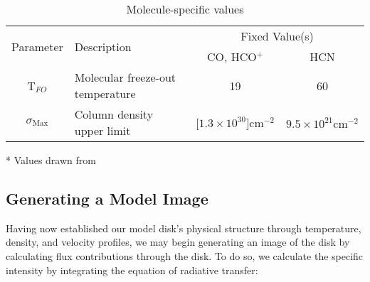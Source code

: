 \begin{table}
  \begin{threeparttable}
    \centering
    \caption{Molecule-specific values}
    \label{tab:mol_specifics}
    \renewcommand{\arraystretch}{1.2}
    \begin{tabular}{c  l  c c }
      \toprule \toprule
      \multirow{2}{*}{Parameter} & \multirow{2}{*}{Description}    & \multicolumn{2}{c}{Fixed Value(s)} \\
                                 &                                 & CO, HCO$^+$ & HCN \\
      \midrule %
      T$_{FO}$            &  Molecular freeze-out temperature      &  19 & 60    \\
      $\sigma_\text{Max}$ & Column density upper limit &  [$1.3 \times 10^{30}] \text{cm}^{-2}$ & $9.5 \times 10^{21} \text{cm}^{-2}$  \\
      \bottomrule
    \end{tabular}
    \begin{tablenotes}\footnotesize
      \item[*] Values drawn from \cite{Factor2017}
    \end{tablenotes}
  \end{threeparttable}
\end{table}








\subsection{Generating a Model Image}

Having now established our model disk's physical structure through temperature, density, and velocity profiles, we may begin generating an image of the disk by calculating flux contributions through the disk. To do so, we calculate the specific intensity by integrating the equation of radiative transfer:

